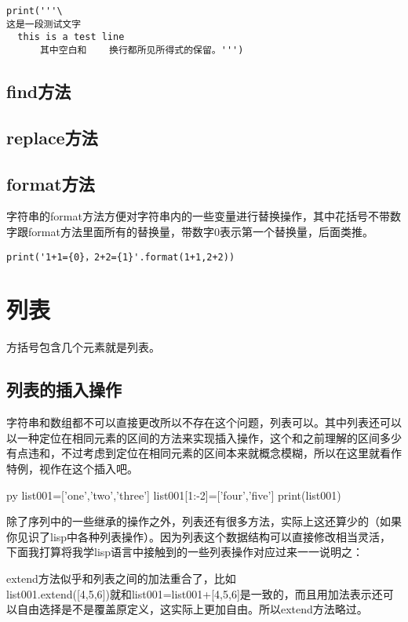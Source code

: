 \documentclass[12pt,oneside]{book}
\begin{document}
\begin{common-format}
\begin{Verbatim}
print('''\
这是一段测试文字
  this is a test line
      其中空白和    换行都所见所得式的保留。''')
\end{Verbatim}

\subsection{find方法}


\subsection{replace方法}


\subsection{format方法}
字符串的format方法方便对字符串内的一些变量进行替换操作，其中花括号不带数字跟format方法里面所有的替换量，带数字0表示第一个替换量，后面类推。
\begin{Verbatim}
print('1+1={0}，2+2={1}'.format(1+1,2+2))
\end{Verbatim}


\section{列表}
方括号包含几个元素就是列表。


\subsection{列表的插入操作}
\label{sec:列表插入操作}
字符串和数组都不可以直接更改所以不存在这个问题，列表可以。其中列表还可以以一种定位在相同元素的区间的方法来实现插入操作，这个和之前理解的区间多少有点违和，不过考虑到定位在相同元素的区间本来就概念模糊，所以在这里就看作特例，视作在这个插入吧。
\begin{xverbatim}[129]{py}
list001=['one','two','three']
list001[1:-2]=['four','five']
print(list001)
\end{xverbatim}

除了序列中的一些继承的操作之外，列表还有很多方法，实际上这还算少的（如果你见识了lisp中各种列表操作）。因为列表这个数据结构可以直接修改相当灵活，下面我打算将我学lisp语言中接触到的一些列表操作对应过来一一说明之：

extend方法似乎和列表之间的加法重合了，比如\\list001.extend([4,5,6])就和list001=list001+[4,5,6]是一致的，而且用加法表示还可以自由选择是不是覆盖原定义，这实际上更加自由。所以extend方法略过。


\end{common-format}
\end{document}
